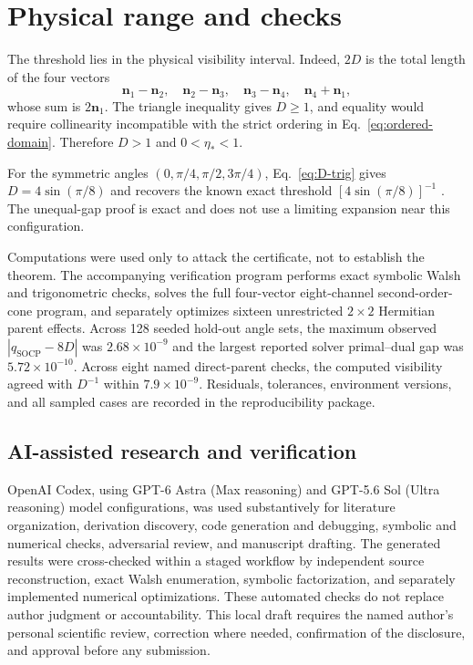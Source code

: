 \documentclass[aps,pra,reprint,superscriptaddress,nofootinbib,longbibliography]{revtex4-2}
\newcommand{\bn}{\bm n}
\begin{document}
\section{Physical range and checks}
\label{sec:checks}

The threshold lies in the physical visibility interval.  Indeed, $2D$ is
the total length of the four vectors
\begin{equation}
 \bn_1-\bn_2,\quad \bn_2-\bn_3,\quad
 \bn_3-\bn_4,\quad \bn_4+\bn_1,
\end{equation}
whose sum is $2\bn_1$.  The triangle inequality gives $D\geq1$, and equality
would require collinearity incompatible with the strict ordering in
Eq.~\eqref{eq:ordered-domain}.  Therefore $D>1$ and $0<\eta_*<1$.

For the symmetric angles
$(0,\pi/4,\pi/2,3\pi/4)$, Eq.~\eqref{eq:D-trig} gives
$D=4\sin(\pi/8)$ and recovers the known exact threshold
$[4\sin(\pi/8)]^{-1}$ \cite{UolaEtAl2016,AndrejicKunjwal2020}.
The unequal-gap proof is exact and does not use a limiting expansion near
this configuration.

Computations were used only to attack the certificate, not to establish the
theorem.  The accompanying verification program performs exact symbolic
Walsh and trigonometric checks, solves the full four-vector eight-channel
second-order-cone program, and separately optimizes sixteen unrestricted
$2\times2$ Hermitian parent effects.  Across 128 seeded hold-out angle sets,
the maximum observed $|q_{\mathrm{SOCP}}-8D|$ was
$2.68\times10^{-9}$ and the largest reported solver primal--dual gap was
$5.72\times10^{-10}$.  Across eight named direct-parent checks, the computed
visibility agreed with $D^{-1}$ within $7.9\times10^{-9}$.  Residuals,
tolerances, environment versions, and all sampled cases are recorded in the
reproducibility package.

\subsection{AI-assisted research and verification}

OpenAI Codex, using GPT-6 Astra (Max reasoning) and GPT-5.6 Sol (Ultra
reasoning) model configurations, was used substantively for literature
organization, derivation discovery, code
generation and debugging, symbolic and numerical checks, adversarial review,
and manuscript drafting.  The generated results were cross-checked within a
staged workflow by independent source reconstruction, exact Walsh
enumeration, symbolic factorization, and separately implemented numerical
optimizations.  These automated checks do not replace author judgment or
accountability.  This local draft requires the named author's personal
scientific review, correction where needed, confirmation of the disclosure,
and approval before any submission.
\end{document}
